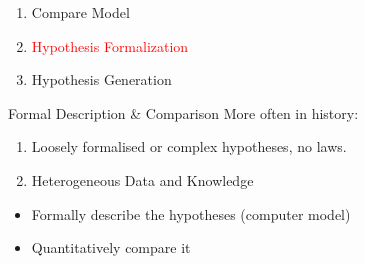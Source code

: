 \documentclass[12pt, notes=show]{beamer}
\begin{document}
\begin{frame}{}
    \begin{center}
	\begin{enumerate}
		\item Compare Model
		\item \textcolor{red}{Hypothesis Formalization}
		\item Hypothesis Generation
			\vfill
	\end{enumerate}
    \end{center}
\end{frame}

\begin{frame}{Formal Description \& Comparison}
    More often in history:
	\begin{enumerate}
	    \item<1-> Loosely formalised or complex hypotheses, no laws.
		\vfill
	    \item<2-> Heterogeneous Data and Knowledge
	\end{enumerate}
		\vfill
	 

	\begin{itemize}
	    \item<5-> Formally describe the hypotheses (computer model)
	    \item<6-> Quantitatively compare it
	\end{itemize}
\end{frame}
\end{document}
